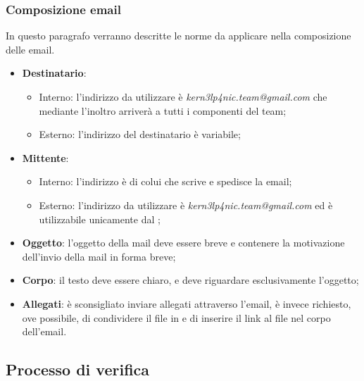 \documentclass[../NormeDiProgetto.tex]{subfiles}
\begin{document}
\subsubsection{Composizione email}
In questo paragrafo verranno descritte le norme da applicare nella
composizione delle email.
\begin{itemize}
	\item \textbf{Destinatario}:
	\begin{itemize}
  		\item Interno: l'indirizzo da utilizzare è \textit{kern3lp4nic.team@gmail.com} che mediante l'inoltro arriverà a tutti i componenti del team;
  		\item Esterno: l'indirizzo del destinatario è variabile;
	\end{itemize}
	\item \textbf{Mittente}:
	\begin{itemize}
  		\item Interno: l'indirizzo è di colui che scrive e spedisce la email;
  		\item Esterno: l'indirizzo da utilizzare è \textit{kern3lp4nic.team@gmail.com} ed è utilizzabile unicamente dal \responsabilediprogetto;
	\end{itemize}
	\item \textbf{Oggetto}: l'oggetto della mail deve essere breve e contenere la motivazione dell'invio della mail in forma breve;
	\item \textbf{Corpo}: il testo deve essere chiaro, e deve riguardare esclusivamente l'oggetto;
	\item \textbf{Allegati}: è sconsigliato inviare allegati attraverso l'email, è invece richiesto, ove possibile, di condividere il file in  e di inserire il link al file nel corpo dell'email.
\end{itemize}

\subsection{Processo di verifica}
\end{document}
